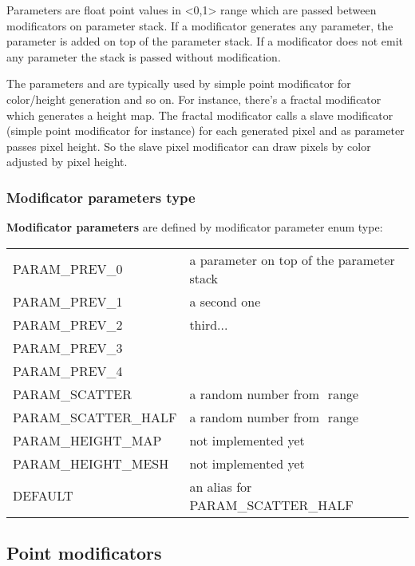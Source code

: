 \documentclass[9pt]{article}
\begin{document}
Parameters are float point values in <0,1> range which are passed between
modificators on parameter stack. If a modificator generates any parameter, the
parameter is added on top of the parameter stack. If a modificator does not
emit any parameter the stack is passed without modification.

The parameters and are typically used by simple point modificator 
for color/height generation and so on. For instance, there's a fractal
modificator which generates a height map. The fractal modificator calls
a slave modificator (simple point modificator for instance) for each generated 
pixel and as parameter passes pixel height. So the slave pixel modificator can 
draw pixels by color adjusted by pixel height.

\subsubsection{Modificator parameters type}

{\bf Modificator parameters} are defined by modificator parameter enum type:
\begin{center}
\begin{tabular}{|l||l|}
PARAM\_PREV\_0 & a parameter on top of the parameter stack \\
PARAM\_PREV\_1 & a second one \\
PARAM\_PREV\_2 & third... \\
PARAM\_PREV\_3 & \\
PARAM\_PREV\_4 & \\
PARAM\_SCATTER & a random number from \begin{math}<-1,1>\end{math} range \\
PARAM\_SCATTER\_HALF & a random number from \begin{math}<0,1>\end{math} range \\
PARAM\_HEIGHT\_MAP & not implemented yet \\
PARAM\_HEIGHT\_MESH & not implemented yet \\
DEFAULT & an alias for PARAM\_SCATTER\_HALF \\
\end{tabular}
\end{center}

\subsection{Point modificators}
\end{document}
